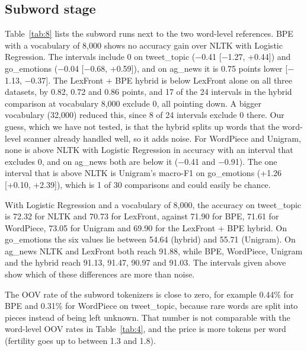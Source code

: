 \documentclass[journal,a4paper]{IEEEtran}
\begin{document}
\subsection{Subword stage}\label{sec:4.5}
Table~\ref{tab:8} lists the subword runs next to the two word-level references. BPE with a vocabulary of 8,000 shows no accuracy gain over NLTK with Logistic Regression. The intervals include 0 on tweet\_topic ($-$0.41 [$-$1.27, +0.44]) and go\_emotions ($-$0.04 [$-$0.68, +0.59]), and on ag\_news it is 0.75 points lower [$-$1.13, $-$0.37]. The LexFront + BPE hybrid is below LexFront alone on all three datasets, by 0.82, 0.72 and 0.86 points, and 17 of the 24 intervals in the hybrid comparison at vocabulary 8,000 exclude 0, all pointing down. A bigger vocabulary (32,000) reduced this, since 8 of 24 intervals exclude 0 there. Our guess, which we have not tested, is that the hybrid splits up words that the word-level scanner already handled well, so it adds noise. For WordPiece and Unigram, none is above NLTK with Logistic Regression in accuracy with an interval that excludes 0, and on ag\_news both are below it ($-$0.41 and $-$0.91). The one interval that is above NLTK is Unigram's macro-F1 on go\_emotions (+1.26 [+0.10, +2.39]), which is 1 of 30 comparisons and could easily be chance.

With Logistic Regression and a vocabulary of 8,000, the accuracy on tweet\_topic is 72.32 for NLTK and 70.73 for LexFront, against 71.90 for BPE, 71.61 for WordPiece, 73.05 for Unigram and 69.90 for the LexFront + BPE hybrid. On go\_emotions the six values lie between 54.64 (hybrid) and 55.71 (Unigram). On ag\_news NLTK and LexFront both reach 91.88, while BPE, WordPiece, Unigram and the hybrid reach 91.13, 91.47, 90.97 and 91.03. The intervals given above show which of these differences are more than noise.

The OOV rate of the subword tokenizers is close to zero, for example 0.44\% for BPE and 0.31\% for WordPiece on tweet\_topic, because rare words are split into pieces instead of being left unknown. That number is not comparable with the word-level OOV rates in Table~\ref{tab:4}, and the price is more tokens per word (fertility goes up to between 1.3 and 1.8).
\end{document}
